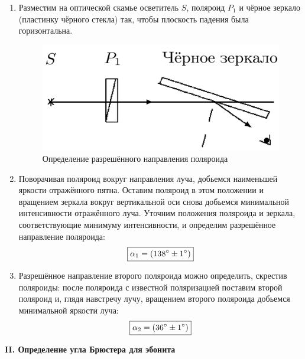 \documentclass[12pt,a4paper]{article}
\begin{document}
	\begin{enumerate}
		\item Разместим на оптической скамье осветитель $S$, поляроид $P_1$ и чёрное зеркало (пластинку чёрного стекла) так, чтобы плоскость падения была горизонтальна.
		
		\begin{figure}[h!]
			\centering
			\includegraphics[scale=0.5]{res/I}
			\caption{Определение разрешённого направления поляроида}
		\end{figure}
		
		\item Поворачивая поляроид вокруг направления луча, добьемся наименьшей яркости отражённого пятна. Оставим поляроид в этом положении и вращением зеркала вокруг вертикальной оси снова добьемся минимальной интенсивности отражённого луча. Уточним положения поляроида и зеркала, соответствующие минимуму интенсивности, и определим разрешённое направление поляроида:
		\begin{equation*}
			\boxed{\alpha_1 = (138\degree \pm 1\degree)}
		\end{equation*}
	
		\item Разрешённое направление второго поляроида можно определить, скрестив поляроиды: после поляроида с известной поляризацией поставим второй поляроид и, глядя навстречу лучу, вращением второго поляроида добьемся минимальной яркости луча:
		\begin{equation*}
			\boxed{\alpha_2 = (36\degree \pm 1\degree)}
		\end{equation*}
	\end{enumerate}


	\begin{center}
		\textbf{II. Определение угла Брюстера для эбонита}
	\end{center}
\end{document}
